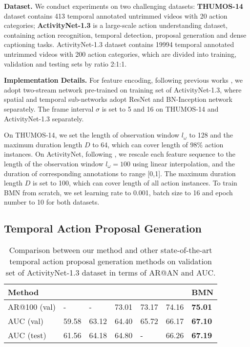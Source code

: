 \documentclass[10pt,twocolumn,letterpaper]{article}
\begin{document}
\noindent
\textbf{Dataset.}
We conduct experiments on two challenging datasets: {\bf THUMOS-14} \cite{jiang2014thumos} dataset contains 413 temporal annotated untrimmed videos with 20 action categories;  {\bf ActivityNet-1.3} \cite{caba2015activitynet}  is a large-scale action understanding dataset, containing action recognition, temporal detection, proposal generation and dense captioning tasks. ActivityNet-1.3 dataset contains 19994 temporal annotated untrimmed videos with 200 action categories, which are divided into training, validation and testing sets by ratio 2:1:1.

\noindent
{\bf Implementation Details.}
For feature encoding, following previous works \cite{lin2018bsn,gao2017turn}, we adopt two-stream network \cite{xiong2016cuhk} pre-trained on training set of ActivityNet-1.3, where spatial and temporal sub-networks adopt ResNet and BN-Inception network separately.
The frame interval $\sigma $ is set  to 5 and 16 on THUMOS-14 and ActivityNet-1.3 separately.

On THUMOS-14, we set the length of observation window $l_\omega$ to 128 and the maximum duration length $D$ to 64, which can cover length of $98\%$ action instances.
On ActivityNet, following \cite{lin2018bsn,lin2017temporal}, we rescale each feature sequence to the length of the observation window $l_\omega = 100$ using linear interpolation, and the duration of corresponding annotations to range [0,1]. The maximum duration length $D$ is set to 100, which can cover length of all action instances.
To train BMN from scratch, we set learning rate to 0.001, batch size to 16 and epoch number to 10 for both datasets.



\subsection{Temporal Action Proposal Generation}


\begin{table}[tbp]
\centering
\caption{ Comparison between our method and other state-of-the-art temporal action proposal generation methods on validation set of  ActivityNet-1.3 dataset in terms of AR@AN and AUC. }
\small
\begin{tabular}{m{1.9cm}m{0.55cm}<{\centering}m{0.55cm}<{\centering}m{0.55cm}<{\centering}m{0.55cm}<{\centering}m{0.55cm}<{\centering}m{0.55cm}<{\centering}}
\toprule
Method  &  \cite{dai2017temporal}   &  \cite{ghanem2017activitynet} & \cite{lin2017temporal}  & \cite{gao2018ctap} &  \cite{lin2018bsn} & BMN \\
\hline 
AR@100 (val)	& -		& - 	& 73.01	& 73.17 & 74.16 & {\bf 75.01}  \\
AUC (val) 		& 59.58 & 63.12 & 64.40 & 65.72	& 66.17 & {\bf 67.10} \\
AUC (test) 		& 61.56	& 64.18 & 64.80 & - 	& 66.26 & {\bf 67.19}  \\
\bottomrule
\end{tabular}
\label{table:proposal_anet}
\end{table}
\end{document}
